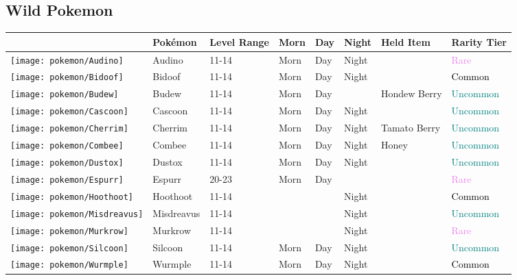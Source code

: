 \subsection{Wild Pokemon}%
\label{subsec:WildPokemon}%
\begin{longtable}{||l l l l l l l l||}%
\hline%
&Pokémon&Level Range&Morn&Day&Night&Held Item&Rarity Tier\\%
\hline%
\endhead%
\hline%
\texttt{[image: pokemon/Audino]}&Audino&11{-}14&Morn&Day&Night&&\textcolor{violet}{%
Rare%
}\\%
\hline%
\texttt{[image: pokemon/Bidoof]}&Bidoof&11{-}14&Morn&Day&Night&&\textcolor{black}{%
Common%
}\\%
\hline%
\texttt{[image: pokemon/Budew]}&Budew&11{-}14&Morn&Day&&Hondew Berry&\textcolor{teal}{%
Uncommon%
}\\%
\hline%
\texttt{[image: pokemon/Cascoon]}&Cascoon&11{-}14&Morn&Day&Night&&\textcolor{teal}{%
Uncommon%
}\\%
\hline%
\texttt{[image: pokemon/Cherrim]}&Cherrim&11{-}14&Morn&Day&Night&Tamato Berry&\textcolor{teal}{%
Uncommon%
}\\%
\hline%
\texttt{[image: pokemon/Combee]}&Combee&11{-}14&Morn&Day&Night&Honey&\textcolor{teal}{%
Uncommon%
}\\%
\hline%
\texttt{[image: pokemon/Dustox]}&Dustox&11{-}14&Morn&Day&Night&&\textcolor{teal}{%
Uncommon%
}\\%
\hline%
\texttt{[image: pokemon/Espurr]}&Espurr&20{-}23&Morn&Day&&&\textcolor{violet}{%
Rare%
}\\%
\hline%
\texttt{[image: pokemon/Hoothoot]}&Hoothoot&11{-}14&&&Night&&\textcolor{black}{%
Common%
}\\%
\hline%
\texttt{[image: pokemon/Misdreavus]}&Misdreavus&11{-}14&&&Night&&\textcolor{teal}{%
Uncommon%
}\\%
\hline%
\texttt{[image: pokemon/Murkrow]}&Murkrow&11{-}14&&&Night&&\textcolor{violet}{%
Rare%
}\\%
\hline%
\texttt{[image: pokemon/Silcoon]}&Silcoon&11{-}14&Morn&Day&Night&&\textcolor{teal}{%
Uncommon%
}\\%
\hline%
\texttt{[image: pokemon/Wurmple]}&Wurmple&11{-}14&Morn&Day&Night&&\textcolor{black}{%
Common%
}\\%
\hline%
\end{longtable}%
